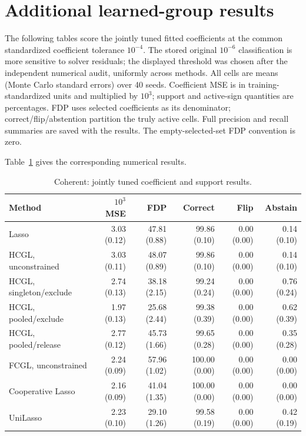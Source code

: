 \documentclass[11pt,a4paper]{article}
\begin{document}
\section{Additional learned-group results}\label{app:learned-metrics}
The following tables score the jointly tuned fitted coefficients at the common
standardized coefficient tolerance $10^{-4}$. The stored original $10^{-6}$
classification is more sensitive to solver residuals; the displayed threshold
was chosen after the independent numerical audit, uniformly across methods.
All cells are means (Monte Carlo
standard errors) over 40 seeds. Coefficient MSE is in training-standardized units
and multiplied by $10^3$; support and active-sign quantities are percentages.
FDP uses selected coefficients as its denominator; correct/flip/abstention
partition the truly active cells. Full precision and recall summaries are saved
with the results. The empty-selected-set FDP convention is zero.

\noindent Table~\ref{tab:learned-metrics-coherent} gives the corresponding numerical results.

\begin{table}[htbp]
\centering\small\setlength{\tabcolsep}{3pt}
\caption{Coherent: jointly tuned coefficient and support results.}
\label{tab:learned-metrics-coherent}
\begin{tabular}{lrrrrr}\toprule
Method & $10^3$ MSE & FDP & Correct & Flip & Abstain\\\midrule
Lasso & 3.03 (0.12) & 47.81 (0.88) & 99.86 (0.10) & 0.00 (0.00) & 0.14 (0.10) \\
HCGL, unconstrained & 3.03 (0.11) & 48.07 (0.89) & 99.86 (0.10) & 0.00 (0.00) & 0.14 (0.10) \\
HCGL, singleton/exclude & 2.74 (0.13) & 38.18 (2.15) & 99.24 (0.24) & 0.00 (0.00) & 0.76 (0.24) \\
HCGL, pooled/exclude & 1.97 (0.13) & 25.68 (2.44) & 99.38 (0.39) & 0.00 (0.00) & 0.62 (0.39) \\
HCGL, pooled/release & 2.77 (0.12) & 45.73 (1.66) & 99.65 (0.28) & 0.00 (0.00) & 0.35 (0.28) \\
FCGL, unconstrained & 2.24 (0.09) & 57.96 (1.02) & 100.00 (0.00) & 0.00 (0.00) & 0.00 (0.00) \\
Cooperative Lasso & 2.16 (0.09) & 41.04 (1.35) & 100.00 (0.00) & 0.00 (0.00) & 0.00 (0.00) \\
UniLasso & 2.23 (0.10) & 29.10 (1.26) & 99.58 (0.19) & 0.00 (0.00) & 0.42 (0.19) \\
\bottomrule\end{tabular}
\end{table}
\end{document}
